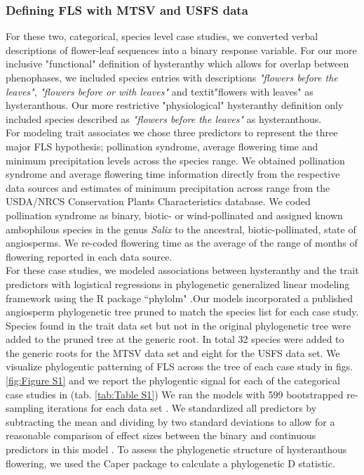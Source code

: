 \documentclass[12pt]{article}\usepackage[]{graphicx}\usepackage[]{color}
\begin{document}
\subsubsection*{Defining FLS with MTSV and USFS data}
\indent\indent  For these two, categorical, species level case studies, we converted verbal descriptions of flower-leaf sequences into a binary response variable. For our more inclusive "functional" definition of hysteranthy which allows for overlap between phenophases, we included species entries with descriptions \textit{"flowers before the leaves"}, \textit{"flowers before or with leaves"} and textit{"flowers with leaves"} as hysteranthous. Our more restrictive "physiological" hysteranthy definition only included species described as \textit{"flowers before the leaves"} as hysteranthous.\\
\ident For modeling trait associates we chose three predictors to represent the three major FLS hypothesis; pollination syndrome, average flowering time and minimum precipitation levels across the species range. We obtained pollination syndrome and average flowering time information directly from the respective data sources and estimates of minimum precipitation across range from the USDA/NRCS Conservation Plants Characteristics database. We coded pollination syndrome as binary, biotic- or wind-pollinated and assigned known ambophilous species in the genus \textit{Salix} to the ancestral, biotic-pollinated, state of angiosperms. We re-coded flowering time as the average of the range of months of flowering reported in each data source.\\
\indent For these case studies, we modeled associations between hysteranthy and the trait predictors with logistical regressions in phylogenetic generalized linear modeling framework \citep{Ives2010} using the R package ``phylolm" \citep{Ho2014}.Our models incorporated a published angiosperm phylogenetic tree \citep{Zanne2013} pruned to match the species list for each case study. Species found in the trait data set but not in the original phylogenetic tree were added to the pruned tree at the generic root. In total 32 species were added to the generic roots for the MTSV data set and eight for the USFS data set. We visualize phylogentic patterning of FLS across the tree of each case study in figs. \ref{fig:Figure S1} and we report the phylogentic signal for each of the categorical case studies in (tab. \ref{tab:Table S1})
We ran the models with 599 bootstrapped re-sampling iterations for each data set \citep{Wilcox2010}. We standardized all predictors by subtracting the mean and dividing by two standard deviations to allow for a reasonable comparison of effect sizes between the binary and continuous predictors in this model \citep{Gelman2007}. To assess the phylogenetic structure of hysteranthous flowering, we used the Caper package \citep{Orme2013} to calculate a phylogenetic D statistic.\\
\end{document}
